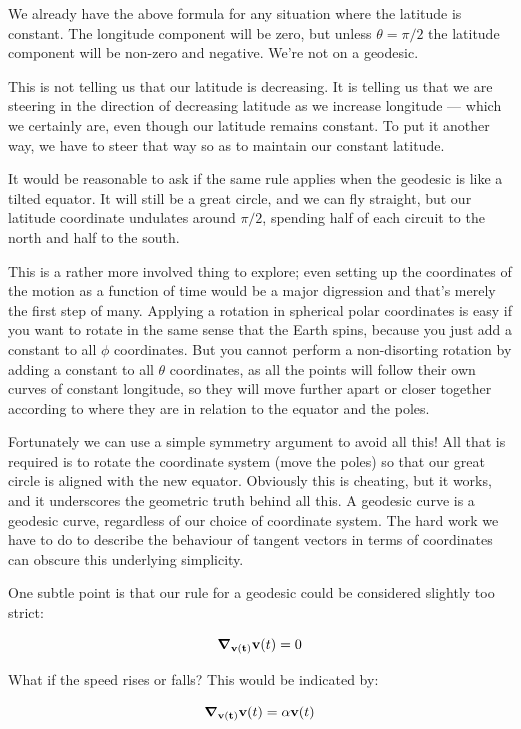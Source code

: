 We already have the above formula for any situation where the latitude is constant. The longitude component will be zero, but unless $\theta = \pi/2$ the latitude component will be non-zero and negative. We're not on a geodesic.

This is not telling us that our latitude is decreasing. It is telling us that we are steering in the direction of decreasing latitude as we increase longitude --- which we certainly are, even though our latitude remains constant. To put it another way, we have to steer that way so as to maintain our constant latitude.

It would be reasonable to ask if the same rule applies when the geodesic is like a tilted equator. It will still be a great circle, and we can fly straight, but our latitude coordinate undulates around $\pi/2$, spending half of each circuit to the north and half to the south.

This is a rather more involved thing to explore; even setting up the coordinates of the motion as a function of time would be a major digression and that's merely the first step of many. Applying a rotation in spherical polar coordinates is easy if you want to rotate in the same sense that the Earth spins, because you just add a constant to all $\phi$ coordinates. But you cannot perform a non-disorting rotation by adding a constant to all $\theta$ coordinates, as all the points will follow their own curves of constant longitude, so they will move further apart or closer together according to where they are in relation to the equator and the poles.

Fortunately we can use a simple symmetry argument to avoid all this! All that is required is to rotate the coordinate system (move the poles) so that our great circle is aligned with the new equator. Obviously this is cheating, but it works, and it underscores the geometric truth behind all this. A geodesic curve is a geodesic curve, regardless of our choice of coordinate system. The hard work we have to do to describe the behaviour of tangent vectors in terms of coordinates can obscure this underlying simplicity.

One subtle point is that our rule for a geodesic could be considered slightly too strict:

$$
\grad_{\mathbf{v(t)}} \mathbf{v}(t) = 0
$$

What if the speed rises or falls? This would be indicated by:

$$
\grad_{\mathbf{v(t)}} \mathbf{v}(t) = \alpha \mathbf{v}(t)
$$

